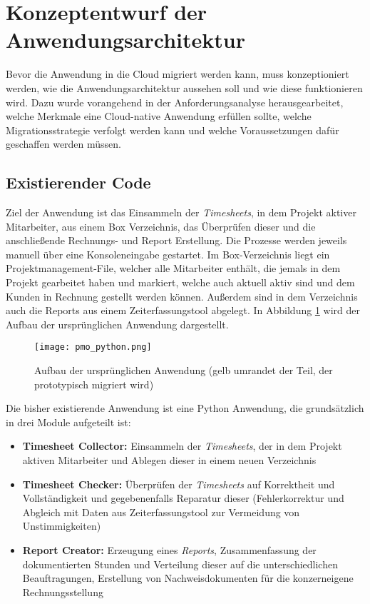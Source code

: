 \section{Konzeptentwurf der Anwendungsarchitektur}
\label{sec:konzeptentwurf}
Bevor die Anwendung in die Cloud migriert werden kann, muss konzeptioniert werden, wie die Anwendungsarchitektur aussehen soll und wie diese funktionieren wird. Dazu wurde vorangehend in der Anforderungsanalyse herausgearbeitet, welche Merkmale eine Cloud-native Anwendung erfüllen sollte, welche Migrationsstrategie verfolgt werden kann und welche Voraussetzungen dafür geschaffen werden müssen.

\subsection{Existierender Code}
Ziel der Anwendung ist das Einsammeln der \textit{\glspl{Timesheet}}, in dem Projekt aktiver Mitarbeiter, aus einem \gls{Box} Verzeichnis, das Überprüfen dieser und die anschließende Rechnungs- und Report Erstellung. Die Prozesse werden jeweils manuell über eine Konsoleneingabe gestartet. Im \gls{Box}-Verzeichnis liegt ein Projektmanagement-File, welcher alle Mitarbeiter enthält, die jemals in dem Projekt gearbeitet haben und markiert, welche auch aktuell aktiv sind und dem Kunden in Rechnung gestellt werden können. Außerdem sind in dem Verzeichnis auch die Reports aus einem Zeiterfassungstool abgelegt. In Abbildung \ref{fig:pmo_python} wird der Aufbau der ursprünglichen Anwendung dargestellt.

\begin{figure}[H]
    \centering
    \texttt{[image: pmo\_python.png]}
    \caption{Aufbau der ursprünglichen Anwendung (gelb umrandet der Teil, der prototypisch migriert wird)}
    \label{fig:pmo_python}
\end{figure}

Die bisher existierende Anwendung ist eine Python Anwendung, die grundsätzlich in drei Module aufgeteilt ist:
\begin{itemize}
\item \textbf{Timesheet Collector: }Einsammeln der \textit{\glspl{Timesheet}}, der in dem Projekt aktiven Mitarbeiter und Ablegen dieser in einem neuen Verzeichnis
\item \textbf{Timesheet Checker: }Überprüfen der \textit{\glspl{Timesheet}} auf Korrektheit und Vollständigkeit und gegebenenfalls Reparatur dieser (Fehlerkorrektur und Abgleich mit Daten aus Zeiterfassungstool zur Vermeidung von Unstimmigkeiten)
\item \textbf{Report Creator: }Erzeugung eines \textit{Reports}, Zusammenfassung der dokumentierten Stunden und Verteilung dieser auf die unterschiedlichen Beauftragungen, Erstellung von Nachweisdokumenten für die konzerneigene Rechnungsstellung
\end{itemize}

